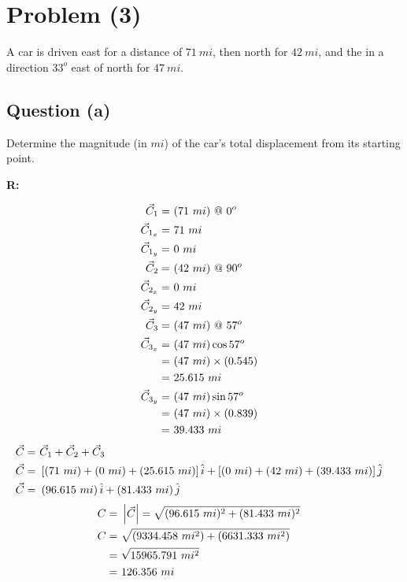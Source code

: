 \section{Problem (3)}
	A car is driven east for a distance of $71 \ mi$, then north for $42 \ mi$, and the in a direction $33^{o}$ east of north for $47 \ mi$.

	\subsection{Question (a)}

		Determine the magnitude (in $mi$) of the car's total displacement from its starting point.

		\textbf{R:} \newline

		\begin{align}
			\vec{C}_{1} = \ &(71 \ mi) \ @ \ 0^{o}& \notag \\
			\vec{C}_{1_{x}} = \ &71 \ mi& \notag \\
			\vec{C}_{1_{y}} = \ &0 \ mi& \notag \\
			\vec{C}_{2} = \ &(42 \ mi) \ @ \ 90^{o}& \notag \\
			\vec{C}_{2_{x}} = \ &0 \ mi& \notag \\
			\vec{C}_{2_{y}} = \ &42 \ mi& \notag \\
			\vec{C}_{3} = \ &(47 \ mi) \ @ \ 57^{o}& \notag \\
			\vec{C}_{3_{x}} = \ &(47 \ mi) \cos{57^{o}}& \notag \\
			= \ &(47 \ mi) \times (0.545)& \notag \\
			= \ &25.615 \ mi& \notag \\
			\vec{C}_{3_{y}} = \ &(47 \ mi) \sin{57^{o}}& \notag \\
			= \ &(47 \ mi) \times (0.839)& \notag \\
			= \ &39.433 \ mi& \notag
		\end{align}
		\begin{align}
			\vec{C} = \ &\vec{C}_{1} + \vec{C}_{2} + \vec{C}_{3}& \notag \\
			\vec{C} = \ &\left[ (71 \ mi) + (0 \ mi) + (25.615 \ mi) \right]\hat{i} + \left[ (0 \ mi) + (42 \ mi) + (39.433 \ mi) \right]\hat{j}& \notag \\
			\vec{C} = \ &\left( 96.615 \ mi \right)\hat{i} + \left( 81.433 \ mi \right) \hat{j}& \notag
		\end{align}
		\begin{align}
			C =  \ &\left| \vec{C} \right| = \sqrt{(96.615 \ mi)^{2} + (81.433 \ mi)^{2}}& \notag \\
			C =  \ &\sqrt{\left(9334.458 \ mi^{2} \right) + \left(6631.333 \ mi^{2} \right)}& \notag \\
			=  \ &\sqrt{15965.791 \ mi^{2}}& \notag \\
			=  \ &126.356 \ mi&
		\end{align}

